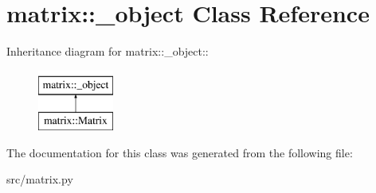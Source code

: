 \hypertarget{classmatrix_1_1__object}{
\section{matrix::\_\-object Class Reference}
\label{d8/ddb/classmatrix_1_1__object}
}
Inheritance diagram for matrix::\_\-object::\begin{figure}[H]
\begin{center}
\leavevmode
\includegraphics[height=2cm]{d8/ddb/classmatrix_1_1__object}
\end{center}
\end{figure}


The documentation for this class was generated from the following file:\begin{DoxyCompactItemize}
\item 
src/matrix.py\end{DoxyCompactItemize}
